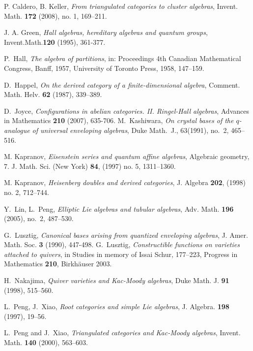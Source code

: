 \documentclass{amsart}
\theoremstyle{definition}
\numberwithin{equation}{section}
\begin{document}

\begin{thebibliography}{10}

P. Caldero, B. Keller, \emph{From triangulated categories to cluster
algebras}, Invent. Math. \textbf{172} (2008), no. 1, 169--211.

J. A. Green, \textit{Hall algebras, hereditary algebras and quantum
groups}, Invent.Math.\textbf{120} (1995), 361-377.

 P.~Hall, \emph{The algebra of partitions}, in: Proceedings 4th Canadian Mathematical Congress, Banff, 1957, University
of Toronto Press, 1958, 147--159.

 D.~Happel, \emph{On the derived category of a finite-dimensional
algebra}, Comment. Math. Helv. \textbf{62} (1987), 339--389.

 D.~Joyce,  \textit{Configurations in abelian categories. II. Ringel-Hall algebras}, Advances in Mathematics {\bf 210} (2007), 635-706.
 M.~Kashiwara, \emph{On crystal bases of the $q$-analogue of universal
enveloping algebras}, Duke Math.~J., 63(1991), no.~2, 465--516.

M. Kapranov, \emph{Eisenstein series and quantum affine algebras},
Algebraic geometry, 7. J. Math. Sci. (New York) \textbf{84}, (1997)
no. 5, 1311--1360.

M. Kapranov, \emph{ Heisenberg doubles and derived categories}, J.
Algebra \textbf{202}, (1998) no. 2, 712--744.

 Y.~Lin, L.~Peng, \emph{Elliptic Lie algebras and tubular algebras},
Adv. Math. \textbf{196} (2005), no.~2, 487--530.

 G.~Lusztig, \textit{Canonical bases arising from quantized enveloping
algebras}, J. Amer. Math. Soc. \textbf{3} (1990), 447-498.
 G.~Lusztig, \textit{Constructible functions on varieties attached to quivers}, in {Studies in memory of
Issai Schur}, 177--223, Progress in Mathematics  {\bf 210},
Birkh\"auser 2003.

 H.~Nakajima, \textit{Quiver varieties and Kac-Moody algebras}, Duke Math. J. {\bf 91} (1998), 515--560.

 L.~Peng, J.~Xiao, \emph{Root categories and simple Lie algebras}, J.
Algebra. {\bf{198}} (1997), 19--56.

 L.~Peng and J.~Xiao, \emph{Triangulated categories and Kac-Moody algebras}, Invent. Math. {\bf 140} (2000), 563--603.


\end{thebibliography}
\end{document}
